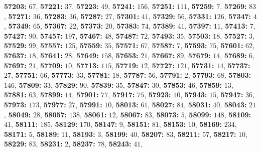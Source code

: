 \textsf{\bfseries 57203:} $67$, \textsf{\bfseries 57221:} $37$, \textsf{\bfseries 57223:} $49$, \textsf{\bfseries 57241:} $156$, \textsf{\bfseries 57251:} $111$, \textsf{\bfseries 57259:} $7$, \textsf{\bfseries 57269:} $83$, \textsf{\bfseries 57271:} $36$, \textsf{\bfseries 57283:} $36$, \textsf{\bfseries 57287:} $27$, \textsf{\bfseries 57301:} $41$, \textsf{\bfseries 57329:} $56$, \textsf{\bfseries 57331:} $126$, \textsf{\bfseries 57347:} $4$, \textsf{\bfseries 57349:} $65$, \textsf{\bfseries 57367:} $22$, \textsf{\bfseries 57373:} $20$, \textsf{\bfseries 57383:} $74$, \textsf{\bfseries 57389:} $41$, \textsf{\bfseries 57397:} $11$, \textsf{\bfseries 57413:} $7$, \textsf{\bfseries 57427:} $90$, \textsf{\bfseries 57457:} $197$, \textsf{\bfseries 57467:} $48$, \textsf{\bfseries 57487:} $72$, \textsf{\bfseries 57493:} $35$, \textsf{\bfseries 57503:} $18$, \textsf{\bfseries 57527:} $3$, \textsf{\bfseries 57529:} $99$, \textsf{\bfseries 57557:} $125$, \textsf{\bfseries 57559:} $35$, \textsf{\bfseries 57571:} $67$, \textsf{\bfseries 57587:} $7$, \textsf{\bfseries 57593:} $75$, \textsf{\bfseries 57601:} $62$, \textsf{\bfseries 57637:} $18$, \textsf{\bfseries 57641:} $28$, \textsf{\bfseries 57649:} $158$, \textsf{\bfseries 57653:} $21$, \textsf{\bfseries 57667:} $89$, \textsf{\bfseries 57679:} $14$, \textsf{\bfseries 57689:} $6$, \textsf{\bfseries 57697:} $21$, \textsf{\bfseries 57709:} $10$, \textsf{\bfseries 57713:} $115$, \textsf{\bfseries 57719:} $12$, \textsf{\bfseries 57727:} $121$, \textsf{\bfseries 57731:} $14$, \textsf{\bfseries 57737:} $27$, \textsf{\bfseries 57751:} $66$, \textsf{\bfseries 57773:} $33$, \textsf{\bfseries 57781:} $18$, \textsf{\bfseries 57787:} $56$, \textsf{\bfseries 57791:} $2$, \textsf{\bfseries 57793:} $68$, \textsf{\bfseries 57803:} $146$, \textsf{\bfseries 57809:} $33$, \textsf{\bfseries 57829:} $90$, \textsf{\bfseries 57839:} $35$, \textsf{\bfseries 57847:} $30$, \textsf{\bfseries 57853:} $46$, \textsf{\bfseries 57859:} $13$, \textsf{\bfseries 57881:} $63$, \textsf{\bfseries 57899:} $14$, \textsf{\bfseries 57901:} $77$, \textsf{\bfseries 57917:} $75$, \textsf{\bfseries 57923:} $10$, \textsf{\bfseries 57943:} $15$, \textsf{\bfseries 57947:} $36$, \textsf{\bfseries 57973:} $173$, \textsf{\bfseries 57977:} $27$, \textsf{\bfseries 57991:} $10$, \textsf{\bfseries 58013:} $61$, \textsf{\bfseries 58027:} $84$, \textsf{\bfseries 58031:} $40$, \textsf{\bfseries 58043:} $21$, \textsf{\bfseries 58049:} $28$, \textsf{\bfseries 58057:} $138$, \textsf{\bfseries 58061:} $12$, \textsf{\bfseries 58067:} $83$, \textsf{\bfseries 58073:} $5$, \textsf{\bfseries 58099:} $148$, \textsf{\bfseries 58109:} $41$, \textsf{\bfseries 58111:} $185$, \textsf{\bfseries 58129:} $170$, \textsf{\bfseries 58147:} $9$, \textsf{\bfseries 58151:} $81$, \textsf{\bfseries 58153:} $10$, \textsf{\bfseries 58169:} $234$, \textsf{\bfseries 58171:} $5$, \textsf{\bfseries 58189:} $11$, \textsf{\bfseries 58193:} $3$, \textsf{\bfseries 58199:} $40$, \textsf{\bfseries 58207:} $83$, \textsf{\bfseries 58211:} $57$, \textsf{\bfseries 58217:} $10$, \textsf{\bfseries 58229:} $83$, \textsf{\bfseries 58231:} $2$, \textsf{\bfseries 58237:} $78$, \textsf{\bfseries 58243:} $41$, 
